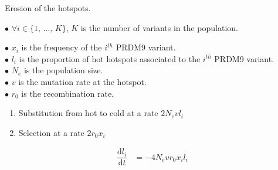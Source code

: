 \documentclass[10pt]{beamer}
\begin{document}
\begin{frame}
	\begin{center}
		\Large
    Erosion of the hotspots.
	\end{center}

	$\bullet$ $\forall i \in \{ 1, \, \dots, \, K \} $, $K$ is the number of variants in the population.
		
	$\bullet$ $x_i$ is the frequency of the $i^{th}$ PRDM9 variant.\\
	
	$\bullet$ $l_i$ is the proportion of hot hotspots associated to the $i^{th}$ PRDM9 variant.\\
	
	$\bullet$ $N_e$ is the population size.\\
	
	$\bullet$ $v$ is the mutation rate at the hotspot.\\
	
	$\bullet$ $r_0$ is the recombination rate.\\
		\begin{enumerate}
	\item Substitution from hot to cold at a rate $ 2 N_e v  l_i $ \\
	\item Selection at a rate $2 r_0 x_i $
	\end{enumerate}
\[
      \begin{aligned}
        \dfrac{\mathrm{d}l_i}{\mathrm{d}t} &= 
        - 4 N_e v r_0 x_i l_i \\
      \end{aligned}
\]
\end{frame}
\end{document}
